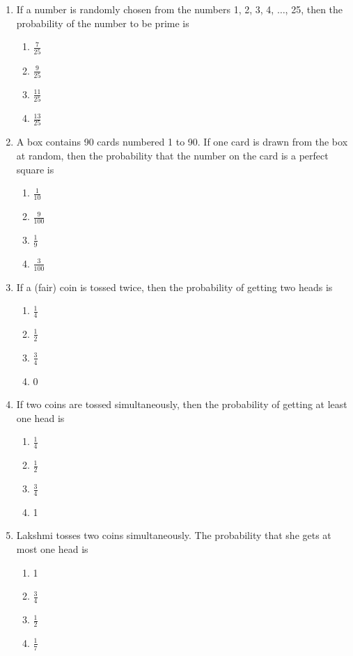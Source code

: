 \documentclass[a4paper, 12pt]{article}
\begin{document}
\begin{multicols}{2}
\begin{enumerate}
		\item If a number is randomly chosen from the numbers 1, 2, 3, 4, $\ldots$, 25, then the probability of the number to be prime is
		\begin{enumerate}
			\item $\frac{7}{25}$
			\item $\frac{9}{25}$
			\item $\frac{11}{25}$
			\item $\frac{13}{25}$
		\end{enumerate}
		
		\item A box contains 90 cards numbered 1 to 90. If one card is drawn from the box at random, then the probability that the number on the card is a perfect square is
		\begin{enumerate}
			\item $\frac{1}{10}$
			\item $\frac{9}{100}$
			\item $\frac{1}{9}$
			\item $\frac{3}{100}$
		\end{enumerate}
		
		\item If a (fair) coin is tossed twice, then the probability of getting two heads is
		\begin{enumerate}
			\item $\frac{1}{4}$
			\item $\frac{1}{2}$
			\item $\frac{3}{4}$
			\item 0
		\end{enumerate}
		
		\item If two coins are tossed simultaneously, then the probability of getting at least one head is
		\begin{enumerate}
			\item $\frac{1}{4}$
			\item $\frac{1}{2}$
			\item $\frac{3}{4}$
			\item 1
		\end{enumerate}
		
		\item Lakshmi tosses two coins simultaneously. The probability that she gets at most one head is
		\begin{enumerate}
			\item 1
			\item $\frac{3}{4}$
			\item $\frac{1}{2}$
			\item $\frac{1}{7}$
		\end{enumerate}
		

\end{enumerate}
\end{multicols}
\end{document}
